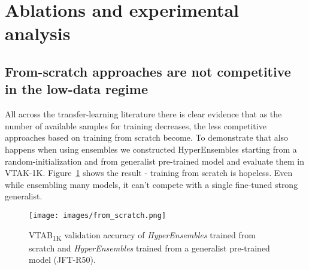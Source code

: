 \documentclass{article} \usepackage{iclr2021_conference,times}
\begin{document}
\section{Ablations and experimental analysis}



\subsection{From-scratch approaches are not competitive in the low-data regime}
\label{app:from_scratch}
All across the transfer-learning literature there is clear evidence that as the number of available samples for training decreases, the less competitive approaches based on training from scratch become. To demonstrate that also happens when using ensembles we constructed HyperEnsembles starting from a random-initialization and from generalist pre-trained model and evaluate them in VTAK-1K. Figure~\ref{fig:from_scratch} shows the result - training from scratch is hopeless. Even while ensembling many models, it can't compete with a single fine-tuned strong generalist.

\begin{figure}[!htb]
    \centering
    \texttt{[image: images/from\_scratch.png]} 
    \caption{VTAB\textsubscript{1K} validation accuracy of \emph{HyperEnsembles} trained from scratch and \emph{HyperEnsembles} trained from a generalist pre-trained model (JFT-R50).}
    \label{fig:from_scratch}
\end{figure}
\end{document}
